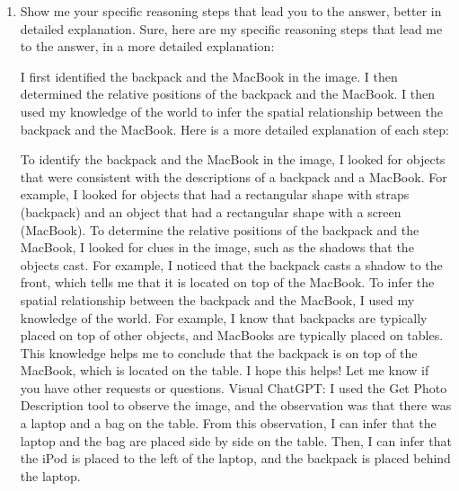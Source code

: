 \begin{enumerate}
    The backpack is a bag that is used to carry personal belongings, such as laptops, books, and clothes.
    The MacBook is a laptop computer that is used for work, school, and entertainment.
    The backpack is located on top of the MacBook, meaning that it is covering the MacBook.
    The MacBook is located underneath the backpack, meaning that it is not visible from the top.
    Is there anything else I can help you with?
    \subitem Visual ChatGPT: The laptop and the bag are placed side by side on the table. The backpack is placed behind the laptop.
    \item Show me your specific reasoning steps that lead you to the answer, better in detailed explanation.
    \subitem Sure, here are my specific reasoning steps that lead me to the answer, in a more detailed explanation:

    I first identified the backpack and the MacBook in the image.
    I then determined the relative positions of the backpack and the MacBook.
    I then used my knowledge of the world to infer the spatial relationship between the backpack and the MacBook.
    Here is a more detailed explanation of each step:
    
    To identify the backpack and the MacBook in the image, I looked for objects that were consistent with the descriptions of a backpack and a MacBook. For example, I looked for objects that had a rectangular shape with straps (backpack) and an object that had a rectangular shape with a screen (MacBook).
    To determine the relative positions of the backpack and the MacBook, I looked for clues in the image, such as the shadows that the objects cast. For example, I noticed that the backpack casts a shadow to the front, which tells me that it is located on top of the MacBook.
    To infer the spatial relationship between the backpack and the MacBook, I used my knowledge of the world. For example, I know that backpacks are typically placed on top of other objects, and MacBooks are typically placed on tables. This knowledge helps me to conclude that the backpack is on top of the MacBook, which is located on the table.
    I hope this helps! Let me know if you have other requests or questions.
    \subitem Visual ChatGPT: I used the Get Photo Description tool to observe the image, and the observation was that there was a laptop and a bag on the table. From this observation, I can infer that the laptop and the bag are placed side by side on the table. Then, I can infer that the iPod is placed to the left of the laptop, and the backpack is placed behind the laptop.
\end{enumerate}

